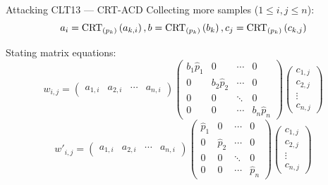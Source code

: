 \documentclass[english]{beamer}
\begin{document}
    \begin{frame}{Attacking CLT13 --- CRT-ACD}
        Collecting more samples ($1 \leq i,j \leq n$):
        \begin{equation*}
            a_i = \crtp[k]{a_{k, i}}, b = \crtp[k]{b_k}, c_j = \crtp[k]{c_{k, j}}
        \end{equation*}

        Stating matrix equations:
        \begin{equation*}
            w_{i,j} =
            \begin{pmatrix}
                a_{1, i} & a_{2, i} & \cdots & a_{n, i}
            \end{pmatrix}
            \begin{pmatrix}
                b_1 \hat{p}_1 & 0 & \cdots & 0 \\
                0 & b_2 \hat{p}_2 & \cdots & 0 \\
                0 & 0 & \ddots & 0 \\
                0 & 0 & \cdots & b_n \hat{p}_n
            \end{pmatrix}
            \begin{pmatrix}
                c_{1, j} \\
                c_{2, j} \\
                \vdots \\
                c_{n, j}
            \end{pmatrix}
        \end{equation*}
        \begin{equation*}
            w'_{i,j} =
            \begin{pmatrix}
                a_{1, i} & a_{2, i} & \cdots & a_{n, i}
            \end{pmatrix}
            \begin{pmatrix}
                \hat{p}_1 & 0 & \cdots & 0 \\
                0 & \hat{p}_2 & \cdots & 0 \\
                0 & 0 & \ddots & 0 \\
                0 & 0 & \cdots & \hat{p}_n
            \end{pmatrix}
            \begin{pmatrix}
                c_{1, j} \\
                c_{2, j} \\
                \vdots \\
                c_{n, j}
            \end{pmatrix}
        \end{equation*}
    \end{frame}
\end{document}
